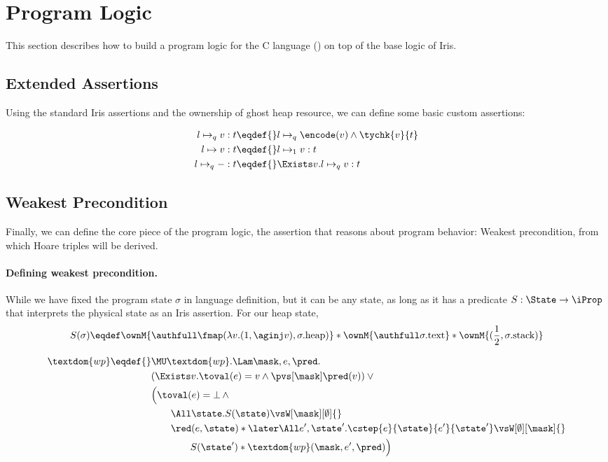\section{Program Logic}
\label{sec:program-logic}

This section describes how to build a program logic for the C language (\cf {}) on top of the base logic of Iris.

\subsection{Extended Assertions}

Using the standard Iris assertions and the ownership of ghost heap resource, we can define some basic custom assertions:

\begin{align*}
l \mapsto_q v : t \eqdef{}&  l \mapsto_q \encode(v) \land \tychk{v}{t} \\
l \mapsto v : t              \eqdef{}& l \mapsto_1 v : t\\
l \mapsto_q - : t            \eqdef{}& \Exists v. l \mapsto_q v : t
\end{align*}

\subsection{Weakest Precondition}

Finally, we can define the core piece of the program logic, the assertion that reasons about program behavior:
Weakest precondition, from which Hoare triples will be derived.

\paragraph{Defining weakest precondition.}

While we have fixed the program state $\sigma$ in language definition, but it can be any state, as long as it has a predicate
$S : \State \to \iProp$ that interprets the physical state as an Iris assertion.
For our heap state, 
\[S(\sigma) \eqdef 
  \ownM{\authfull \fmap (\lambda v. (1, \aginj v), \sigma.\text{heap})} *
  \ownM{\authfull \sigma.\text{text}} *
  \ownM{(\frac12, \sigma.\text{stack})}
\]

\begin{align*}
  \textdom{wp} \eqdef{}& \MU \textdom{wp}. \Lam \mask, e, \pred. \\
        & (\Exists v. \toval(e) = v \land \pvs[\mask] \pred(v)) \lor {}\\
        & \Bigl(\toval(e) = \bot \,\land \\
        &\qquad \All \state. S(\state) \vsW[\mask][\emptyset] {}\\
        &\qquad \red(e, \state) * \later\All e', \state'. \cstep{e}{\state}{e'}{\state'} \vsW[\emptyset][\mask] {}\\
        &\qquad\qquad S(\state') * \textdom{wp}(\mask, e', \pred)\Bigr) \\
\end{align*}

